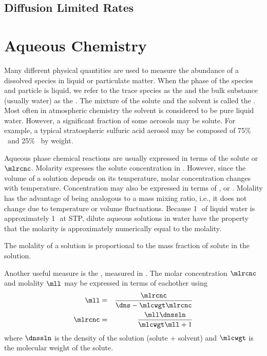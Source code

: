\documentclass[12pt,twoside]{book}
\newcounter{reaction} %
\begin{document}
\section[Diffusion Limited Rates]{Diffusion Limited Rates}

\chapter{Aqueous Chemistry}\label{sxn:chm_aqs}
Many different physical quantities are used to measure the abundance
of a dissolved species in liquid or particulate matter.
When the phase of the species and particle is liquid, we refer to the
trace species as the  and the bulk substance (usually
water) as the . 
The mixture of the solute and the solvent is called the
. 
Most often in atmospheric chemistry the solvent is considered to be
pure liquid water.
However, a significant fraction of some aerosols may be solute.
For example, a typical stratospheric sulfuric acid aerosol may be
composed of 75\% \HdSOq\ and 25\% \HdO\ by weight.

Aqueous phase chemical reactions are usually expressed in terms of the
solute  or  $\mlrcnc$.
Molarity expresses the solute concentration in \molxl. 
However, since the volume of a solution depends on its temperature,
molar concentration changes with temperature.
Concentration may also be expressed in terms of , or
\molxkg.
Molality has the advantage of being analogous to a mass mixing ratio,
i.e., it does not change due to temperature or volume fluctuations.
Because 1\,\kg\ of liquid water is approximately 1\,\ltr\ at STP, dilute
aqueous solutions in water have the property that the molarity is
approximately numerically equal to the molality.

The molality of a solution is proportional to the mass fraction of
solute in the solution.

Another useful measure is the , measured
in \molxmC.
The molar concentration $\mlrcnc$ and molality $\mll$ may be expressed
in terms of eachother using
\begin{eqnarray}
\label{eqn:mll_dfn}
\mll & = & \frac{\mlrcnc}{\dns - \mlcwgt \mlrcnc} \\
\label{eqn:mlrcnc_dfn}
\mlrcnc & = & \frac{\mll \dnssln}{\mlcwgt \mll + 1}
\end{eqnarray}
where $\dnssln$ is the density of the solution (solute + solvent) and 
$\mlcwgt$ is the molecular weight of the solute.
\end{document}
